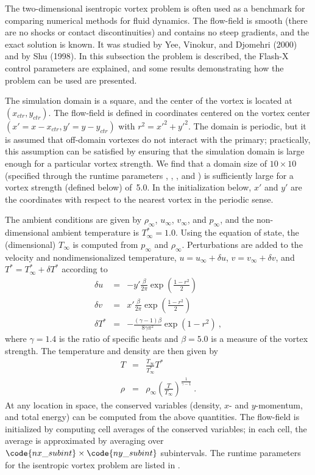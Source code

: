 The two-dimensional isentropic vortex problem is often used as a
benchmark for comparing numerical methods for fluid dynamics. The
flow-field is smooth (there are no shocks or contact discontinuities)
and contains no steep gradients, and the exact solution is known. It
was studied by Yee, Vinokur, and Djomehri (2000) and by Shu (1998). In
this subsection the problem is described, the Flash-X control parameters
are explained, and some results demonstrating how the problem can be
used are presented.

The simulation domain is a square, and the center of the vortex is
located at $(x_{ctr}, y_{ctr})$. The flow-field is defined in
coordinates centered on the vortex center $(x' = x - x_{ctr}, y' = y
- y_{ctr})$ with $r^2 = {x'}^2 + {y'}^2$. The domain is periodic, but
it is assumed that off-domain vortexes do not interact with the
primary; practically, this assumption can be
satisfied by ensuring that the simulation domain is large enough for a
particular vortex strength. We find that a domain size of $10 \times
10$ (specified through the  runtime parameters ,
, , and ) is sufficiently large for a
vortex strength (defined below) of~5.0. In the initialization below,
$x'$ and $y'$ are the coordinates with respect to the nearest vortex
in the periodic sense.

The ambient conditions are given by $\rho_\infty$, $u_\infty$,
$v_\infty$, and $p_\infty$, and the non-dimensional ambient temperature
is $T^*_\infty = 1.0$. Using the equation of state, the (dimensional)
$T_\infty$ is computed from $p_\infty$ and
$\rho_\infty$. Perturbations are added to the velocity and
nondimensionalized temperature, $u = u_\infty + \delta u$, $v =
v_\infty + \delta v$, and $T^* = T^*_\infty + \delta T^*$ according to
\begin{eqnarray}
\label{Eqn:isentropic_three}
\delta u &=&
-y' {\frac {\beta} {2 \pi}} \exp \left( {\frac {1-r^2} {2}} \right) \\
\delta v &=&
 x' {\frac {\beta} {2 \pi}} \exp \left( {\frac {1-r^2} {2}} \right) \\
\delta T^* &=&
- { \frac {(\gamma - 1 ) \beta}  {8 \gamma \pi^2}} \exp \left( {1-r^2}
\right)~,
\end{eqnarray}
where $\gamma=1.4$ is the ratio of specific heats and $\beta=5.0$ is a
measure of the vortex strength. The temperature and density are then given by
\begin{eqnarray}
T &=& {\frac{T_\infty}{T^*_\infty} } T^* \\
\rho &=& \rho_\infty
  \left( {\frac{T}{T_\infty} } \right)^{\frac{1}{\gamma-1} }~.
\end{eqnarray}
At any location in space, the conserved variables (density, $x$- and
$y$-momentum, and total energy) can be computed from the above
quantities.  The flow-field is initialized by computing cell averages
of the conserved variables; in each cell, the average is
approximated by averaging over $\code{nx\_subint} \times
\code{ny\_subint}$ subintervals. The runtime parameters for the
isentropic vortex problem are listed in .

